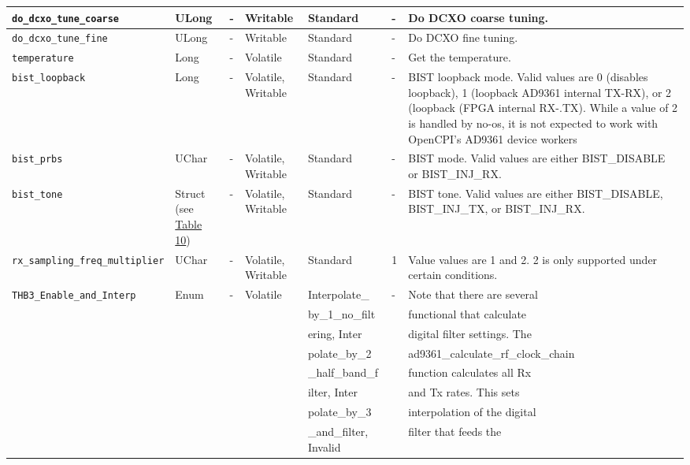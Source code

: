 \documentclass{article}
\begin{document}
\begin{landscape}
\begin{scriptsize}
\begin{longtable}{|p{3.6cm}|p{8.1cm}|p{1.4cm}|p{1.3cm}|p{1.4cm}|p{2.5cm}|p{3.6cm}|}
			\hline
			\verb+do_dcxo_tune_coarse+ & ULong & - & Writable & Standard & - & Do DCXO coarse tuning.\\
			\hline
			\verb+do_dcxo_tune_fine+ & ULong & - & Writable & Standard & - & Do DCXO fine tuning. \\
			\hline
			\verb+temperature+ & Long & - & Volatile & Standard & - & Get the temperature. \\
			\hline
			\verb+bist_loopback+ & Long & - & Volatile, Writable & Standard & - & BIST loopback mode. Valid values are 0 (disables loopback), 1 (loopback AD9361 internal TX-RX), or 2 (loopback (FPGA internal RX-.TX). While a value of 2 is handled by no-os, it is not expected to work with OpenCPI's AD9361 device workers \\
			\hline
			\verb+bist_prbs+ & UChar & - & Volatile, Writable & Standard & - & BIST mode. Valid values are either BIST\_DISABLE or BIST\_INJ\_RX. \\
			\hline
			\verb+bist_tone+ & Struct (see \hyperlink{tab10}{Table 10}) & - & Volatile, Writable & Standard & - & BIST tone. Valid values are either BIST\_DISABLE, BIST\_INJ\_TX, or BIST\_INJ\_RX. \\
			\hline
			\verb+rx_sampling_freq_multiplier+ & UChar & - & Volatile, Writable & Standard & 1 & Value values are 1 and 2. 2 is only supported under certain conditions. \\
			\hline
			\verb+THB3_Enable_and_Interp+ & Enum & - & Volatile & Interpolate\_ & - &  Note that there are several \\
			                              &      &   &          & by\_1\_no\_filt        &   & functional that calculate \\
			                              &      &   &          & ering, Inter           &   & digital filter settings. The \\
			                              &      &   &          & polate\_by\_2          &   &  ad9361\_calculate\_rf\_clock\_chain \\
			                              &      &   &          & \_half\_band\_f        &   &  function calculates all Rx \\
			                              &      &   &          & ilter, Inter           &   &  and Tx rates. This sets \\
			                              &      &   &          & polate\_by\_3          &   &  interpolation of the digital\\
			                              &      &   &          & \_and\_filter, Invalid &   &  filter that feeds the

\end{longtable}
\end{scriptsize}
\end{landscape}
\end{document}
